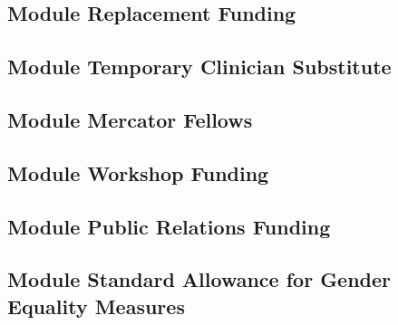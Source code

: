 \documentclass{scrartcl}
\begin{document}
\subsection{Module Replacement Funding}

\subsection{Module Temporary Clinician Substitute}

\subsection{Module Mercator Fellows}

\subsection{Module Workshop Funding}

\subsection{Module Public Relations Funding}

\subsection{Module Standard Allowance for Gender Equality Measures}
\end{document}
